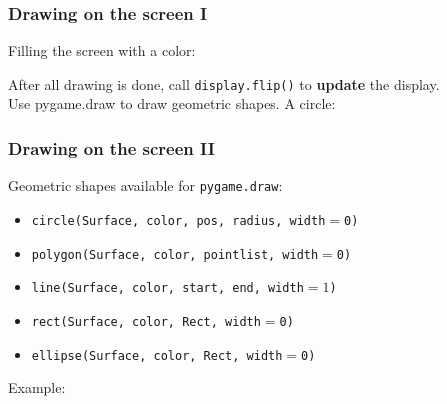 \documentclass[]{beamer}   %
\begin{document}

\begin{frame}
\frametitle{Drawing on the screen I}
Filling the screen with a color:

\screenFill
\pause
After all drawing is done, call \textcolor{tg}{\texttt{display.flip()}} to \textbf{update} the display.\\
\bigskip
\medskip
\pause
Use pygame.draw to draw geometric shapes. A circle:
\drawCircle

\end{frame}




\begin{frame}
\frametitle{Drawing on the screen II}

Geometric shapes available for \textcolor{tg}{\texttt{pygame.draw}}:
\medskip
\begin{itemize}
\pause
\item[] \textcolor{tg}{\texttt{circle(Surface, color, pos, radius, width$=$0)}}
\pause
\item[] \textcolor{tg}{\texttt{\mbox{polygon(Surface, color, pointlist, width$=$0)}}}
\pause
\item[] \textcolor{tg}{\texttt{line(Surface, color, start, end, width$=1$)}}
\pause
\item[] \textcolor{tg}{\texttt{rect(Surface, color, Rect, width$=$0)}}
\pause
\item[] \textcolor{tg}{\texttt{ellipse(Surface, color, Rect, width$=$0)}}
\end{itemize}
\bigskip
\medskip
\pause
Example:
\redLine

\end{frame}


\end{document}
